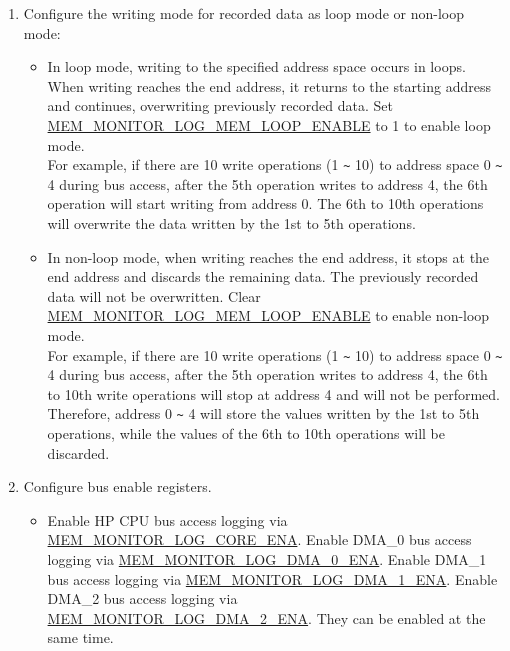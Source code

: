 \documentclass[main\_\_EN.tex]{subfiles}
\begin{document}
\begin{enumerate}
\begin{itemize}
        \end{itemize}
    \item \label{other:dbgassist-item-log-config-step5} Configure the writing mode for recorded data as loop mode or non-loop mode:
        \begin{itemize}
            \item In loop mode, writing to the specified address space occurs in loops. When writing reaches the end address, it returns to the starting address and continues, overwriting previously recorded data. Set \hyperref[fielddesc:MEMMONITORLOGMEMLOOPENABLE]{MEM\_MONITOR\_LOG\_MEM\_LOOP\_ENABLE} to 1 to enable loop mode.\\
            For example, if there are 10 write operations (1 \verb+~+ 10) to address space 0 \verb+~+ 4 during bus access, after the 5th operation writes to address 4, the 6th operation will start writing from address 0. The 6th to 10th operations will overwrite the data written by the 1st to 5th operations.
            \item In non-loop mode, when writing reaches the end address, it stops at the end address and discards the remaining data. The previously recorded data will not be overwritten. Clear \hyperref[fielddesc:MEMMONITORLOGMEMLOOPENABLE]{MEM\_MONITOR\_LOG\_MEM\_LOOP\_ENABLE} to enable non-loop mode.\\
            For example, if there are 10 write operations (1 \verb+~+ 10) to address space 0 \verb+~+ 4 during bus access, after the 5th operation writes to address 4, the 6th to 10th write operations will stop at address 4 and will not be performed. Therefore, address 0 \verb+~+ 4 will store the values written by the 1st to 5th operations, while the values of the 6th to 10th operations will be discarded.
        \end{itemize}
    \item Configure bus enable registers.
        \begin{itemize}
            \item Enable HP CPU bus access logging via \hyperref[fielddesc:MEMMONITORLOGCOREENA]{MEM\_MONITOR\_LOG\_CORE\_ENA}. Enable DMA\_0 bus access logging via \hyperref[fielddesc:MEMMONITORLOGDMA0ENA]{MEM\_MONITOR\_LOG\_DMA\_0\_ENA}. Enable DMA\_1 bus access logging via \hyperref[fielddesc:MEMMONITORLOGDMA1ENA]{MEM\_MONITOR\_LOG\_DMA\_1\_ENA}. Enable  DMA\_2 bus access logging via \hyperref[fielddesc:MEMMONITORLOGDMA2ENA]{MEM\_MONITOR\_LOG\_DMA\_2\_ENA}. They can be enabled at the same time.
        \end{itemize}
\end{enumerate}
\end{document}
